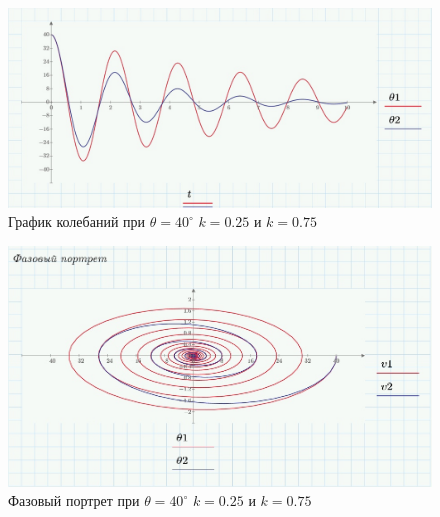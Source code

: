 \documentclass[a4paper, 14pt]{extarticle}
\begin{document}
		\begin{figure}[H]
			\centering
			\includegraphics[width = \linewidth]{14.jpg}
			\caption[.] {График колебаний при $\theta = 40^{\circ}$ $k = 0.25$ и $k=0.75$}
		\end{figure}
		\begin{figure}[H]
			\centering
			\includegraphics[width = \linewidth]{15.jpg}
			\caption[.] {Фазовый портрет при $\theta = 40^{\circ}$ $k = 0.25$ и $k=0.75$}
		\end{figure}
	\pagebreak
\end{document}
